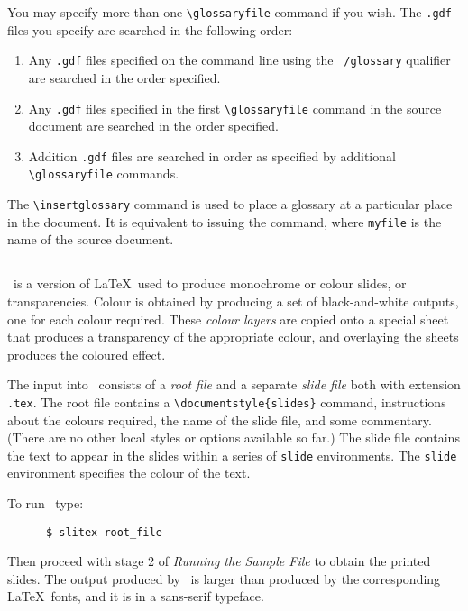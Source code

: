 You may specify more than one \verb+\glossaryfile+ command if you wish.  The
{\tt .gdf} files you specify are searched in the following order:
\begin{enumerate}
\item Any {\tt .gdf} files specified on the command line using the {\tt 
/glossary} qualifier are searched in the order specified.
\item Any {\tt .gdf} files specified in the first \verb+\glossaryfile+ command
in the source document are searched in the order specified.
\item Addition {\tt .gdf} files are searched in order as specified by additional
\verb+\glossaryfile+ commands.
\end{enumerate}

The \verb+\insertglossary+ command is
used to place a glossary at a particular place in the document.  It is
equivalent to issuing the \verb++ command, where {\tt myfile}
is the name of the source document.



\subsection{\protect\SLiTeX}
\label{se:slitex}
\SLiTeX\ is a version of \LaTeX\ used to produce monochrome or colour
slides, or transparencies. Colour is obtained by producing a set of
black-and-white outputs, one for each colour required. These
{\em colour layers\/} are copied onto a special sheet that produces
a transparency of the appropriate colour, and overlaying the
sheets produces the coloured effect.

The input into \SLiTeX\ consists of a {\em root file\/} and a separate
{\em slide file\/} both with extension \mbox{\tt .tex}. 
The root file contains a \hbox{\verb|\documentstyle{slides}|}
command, instructions about the colours required, the name of
the slide file, and some commentary.
(There are no other local styles or options available so far.)
The slide file contains the text to appear in the slides within
a series of \mbox{\tt slide} environments.  The \mbox{\tt slide} environment
specifies the colour of the text.

To run \SLiTeX\ type:
\begin{verbatim}
      $ slitex root_file
\end{verbatim}
Then proceed with stage 2 of {\em Running the Sample File\/}
to obtain the printed slides.
The output produced by \SLiTeX\ is larger than produced by the
corresponding \LaTeX\ fonts, and it is in a sans-serif typeface.


